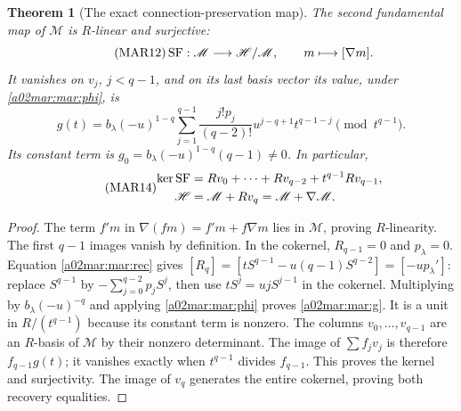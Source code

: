 \documentclass[11pt,a4paper]{article}
\newtheorem{theorem}{Theorem}[section]
\begin{document}
\begin{theorem}[The exact connection-preservation map]\label{a02mar:mar:SFthm}
The second fundamental map of $\mathscr M$ is $R$-linear and surjective:
\begin{equation}\tag{MAR12}\label{a02mar:mar:SF}
 \operatorname{SF}:\mathscr M\longrightarrow\mathscr H/\mathscr M,
 \qquad m\longmapsto[\nabla m].
\end{equation}
It vanishes on $v_j$, $j<q-1$, and on its last basis vector its value,
under \eqref{a02mar:mar:phi}, is
\begin{equation}\tag{MAR13}\label{a02mar:mar:g}
 g(t)=b_\lambda(-u)^{1-q}
 \sum_{j=1}^{q-1}\frac{j!p_j}{(q-2)!}
                 u^{j-q+1}t^{q-1-j}\pmod{t^{q-1}}.
\end{equation}
Its constant term is $g_0=b_\lambda(-u)^{1-q}(q-1)\ne0$.
In particular,
\begin{equation}\tag{MAR14}\label{a02mar:mar:SFkernel}
 \begin{aligned}
 \ker\operatorname{SF}&=Rv_0+\cdots+Rv_{q-2}+t^{q-1}Rv_{q-1},\\
 \mathscr H&=\mathscr M+Rv_q=\mathscr M+\nabla\mathscr M.
 \end{aligned}
\end{equation}
\end{theorem}
\begin{proof}
The term $f'm$ in $\nabla(fm)=f'm+f\nabla m$ lies in
$\mathscr M$, proving $R$-linearity. The first $q-1$ images
vanish by definition. In the cokernel, $R_{q-1}=0$ and
$p_\lambda=0$. Equation \eqref{a02mar:mar:rec} gives
$[R_q]=[tS^{q-1}-u(q-1)S^{q-2}]=[-u p_\lambda']$:
replace $S^{q-1}$ by $-\sum_{j=0}^{q-2}p_jS^j$, then use
$tS^j=ujS^{j-1}$ in the cokernel. Multiplying by
$b_\lambda(-u)^{-q}$ and applying \eqref{a02mar:mar:phi} proves
\eqref{a02mar:mar:g}. It is a unit in $R/(t^{q-1})$ because its
constant term is nonzero. The columns $v_0,\ldots,v_{q-1}$
are an $R$-basis of $\mathscr M$ by their nonzero determinant.
The image of $\sum f_jv_j$ is therefore $f_{q-1}g(t)$;
it vanishes exactly when $t^{q-1}$ divides $f_{q-1}$. This
proves the kernel and surjectivity. The image of $v_q$ generates
the entire cokernel, proving both recovery equalities.
\end{proof}
\end{document}
